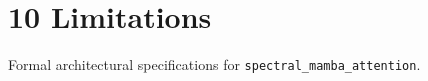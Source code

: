 \section{10 Limitations}

Formal architectural specifications for \texttt{spectral_mamba_attention}.
